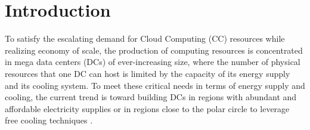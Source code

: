 \section{Introduction}
\label{sec:intro}

To satisfy the escalating demand for Cloud Computing (CC) resources while
realizing economy of scale, the production of computing resources is
concentrated in mega data centers (DCs) of ever-increasing size, where
the number of physical resources that one DC can host is limited by
the capacity of its energy supply and its cooling system. To
meet these critical needs in terms of energy supply and cooling, the
current trend is toward building DCs in regions with abundant and
affordable electricity supplies or in regions close to the polar
circle to leverage free cooling techniques \cite{greenpeace:2013}.


